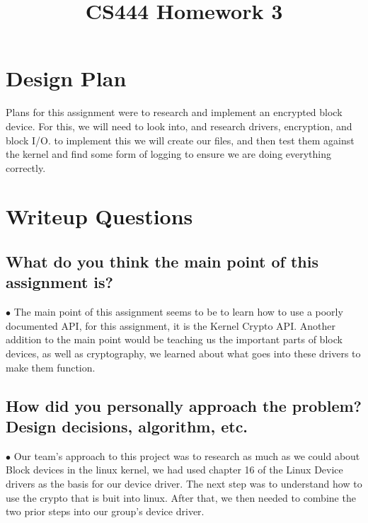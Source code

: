 \documentclass[letterpaper,10pt,fleqn,draftclsnofoot,onecolumn]{IEEEtran}
\title{CS444 Homework 3}
\author{\name}
\begin{document}
	\maketitle
	\hrulefill
	\section*{Design Plan}
	Plans for this assignment were to research and implement an encrypted block device. For this, we will need to look into, and research drivers, encryption, and block I/O. to implement this we will create our files, and then test them against the kernel and find some form of logging to ensure we are doing everything correctly.
	
	\section*{Writeup Questions}
	
	\subsection{What do you think the main point of this assignment is?}
	$\bullet$ The main point of this assignment seems to be to learn how to use a poorly documented API, for this assignment, it is the Kernel Crypto API. Another addition to the main point would be teaching us the important parts of block devices, as well as cryptography, we learned about what goes into these drivers to make them function. 
	
	\subsection{How did you personally approach the problem? Design decisions, algorithm, etc.}
	$\bullet$ Our team's approach to this project was to research as much as we could about Block devices in the linux kernel, we had used chapter 16 of the Linux Device drivers as the basis for our device driver. \cite{orlybook}%
	The next step was to understand how to use the crypto that is buit into linux. After that, we then needed to combine the two prior steps into our group's device driver.
	
\end{document}
